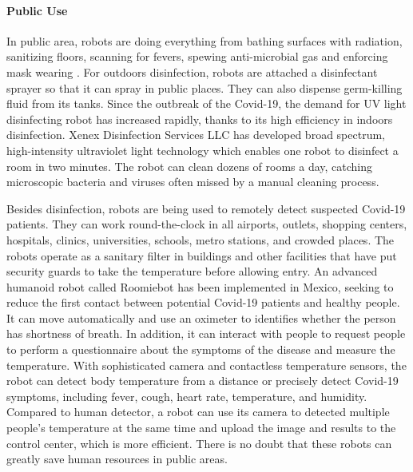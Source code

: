 \documentclass[a4paper]{article}
\begin{document}
\paragraph{Public Use}
    In public area, robots are doing everything from bathing surfaces with radiation, sanitizing floors, scanning for fevers, spewing anti-microbial gas and enforcing mask wearing \cite{19}. For outdoors disinfection, robots are attached a disinfectant sprayer so that it can spray in public places. They can also dispense germ-killing fluid from its tanks. Since the outbreak of the Covid-19, the demand for UV light disinfecting robot has increased rapidly, thanks to its high efficiency in indoors disinfection. Xenex Disinfection Services LLC has developed broad spectrum, high-intensity ultraviolet light technology which enables one robot to disinfect a room in two minutes\cite{20}. The robot can clean dozens of rooms a day, catching microscopic bacteria and viruses often missed by a manual cleaning process. 
\par 
    Besides disinfection, robots are being used to remotely detect suspected Covid-19 patients. They can work round-the-clock in all airports, outlets, shopping centers, hospitals, clinics, universities, schools, metro stations, and crowded places\cite{21}. The robots operate as a sanitary filter in buildings and other facilities that have put security guards to take the temperature before allowing entry. An advanced humanoid robot called Roomiebot has been implemented in Mexico, seeking to reduce the first contact between potential Covid-19 patients and healthy people. It can move automatically and use an oximeter to identifies whether the person has shortness of breath\cite{22}. In addition, it can interact with people to request people to perform a questionnaire about the symptoms of the disease and measure the temperature\cite{23}. With sophisticated camera and contactless temperature sensors, the robot can detect body temperature from a distance or precisely detect Covid-19 symptoms, including fever, cough, heart rate, temperature, and humidity. Compared to human detector, a robot can use its camera to detected multiple people's temperature at the same time and upload the image and results to the control center, which is more efficient. There is no doubt that these robots can greatly save human resources in public areas.
\end{document}
